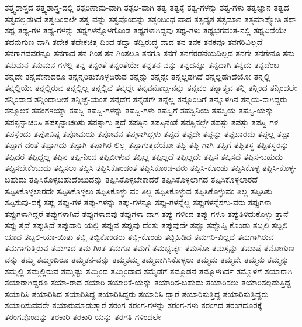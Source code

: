 {ತತ್ತ್ವಶಾಸ್ತ್ರದ
ತತ್ತ್ವಶಾಸ್ತ್ರ-ದಲ್ಲಿ
ತತ್ಪರಿಣಾಮ-ವಾಗಿ
ತತ್ಫಲ-ವಾಗಿ
ತತ್ವ
ತತ್ವಕ್ಕೆ
ತತ್ವ-ಗಳನ್ನು
ತತ್ವ-ಗಳು
ತತ್ವಜ್ಞಾನ
ತತ್ವದ
ತತ್ವದಲ್ಲಡಗಿದೆ
ತತ್ವದಿಂದಲೇ
ತತ್ವ-ವನ್ನು
ತತ್ವವೊಂದನ್ನು
ತತ್ಸಂಬಂಧ-ವಾದ
ತತ್ಸದೃಶ
ತತ್ಸಮಾನ
ತತ್ಸಮಾಪ್ನೋತಿ
ತಥಾ
ತಥ್ಯ
ತಥ್ಯ-ಗಳ
ತಥ್ಯ-ಗಳನ್ನು
ತಥ್ಯಗಳನ್ನೊಳಗೊಂಡ
ತಥ್ಯಗಳಾಗಿದ್ದವು
ತಥ್ಯ-ಗಳು
ತಥ್ಯಭಗವಂತ-ನಲ್ಲಿ
ತಥ್ಯವಿದೆಯೇ
ತದನುಗುಣ-ವಾಗಿ
ತದೇಕ
ತದೇಕಚಿತ್ತ-ದಿಂದ
ತದ್ವಾ
ತದ್ವಿರುದ್ಧ-ವಾದ
ತನ
ತನಕ
ತನಕವೂ
ತನಗರಿವಿಲ್ಲದೆ
ತನಗಾಗದವರನ್ನೂ
ತನಗಾದ
ತನ-ಗಿಂತ
ತನ-ಗಿಂತಲೂ
ತನಗೂ
ತನಗೆ
ತನಗೆರಡನೆಯದಿಲ್ಲದ
ತನಗೇ
ತನಗೇನೂ
ತನು
ತನುಮನ
ತನುಮನ-ಗಳಲ್ಲಿ
ತನ್ನ
ತನ್ನಂತೆ
ತನ್ನಂತೆಯೇ
ತನ್ನತನ-ವನ್ನು
ತನ್ನದನ್ನೂ
ತನ್ನದಾಗಿ
ತನ್ನದು
ತನ್ನದೆಂಬ
ತನ್ನದೇ
ತನ್ನದೇನಾದರೂ
ತನ್ನನ್ನರಿತುಕೊಳ್ಳದಿರುವ
ತನ್ನನ್ನು
ತನ್ನನ್ನೇ
ತನ್ನಲ್ಲಡಗಿದೆ
ತನ್ನಲ್ಲಡಗಿದೆಯೋ
ತನ್ನಲ್ಲಿ
ತನ್ನಲ್ಲಿಯೇ
ತನ್ನಲ್ಲಿರುವ
ತನ್ನಲ್ಲಿಲ್ಲ
ತನ್ನಲ್ಲಿವೆ
ತನ್ನಲ್ಲೇ
ತನ್ನವನೊಬ್ಬ-ನನ್ನು
ತನ್ನವರ
ತನ್ನಾತ್ಮವ
ತನ್ನಿ
ತನ್ನಿಂದ
ತನ್ನಿಂದಲೇ
ತನ್ನಿಂದಾದ
ತನ್ನಿಂದಾದೀತೆ
ತನ್ನಿಚ್ಛೆ-ಯಂತೆ
ತನ್ನೆಡೆಗೆ
ತನ್ನೆಡೆಗೇ
ತನ್ನೆಲ್ಲ
ತನ್ನೊಂದಿಗೆ
ತನ್ನೊಳಗಿನ
ತನ್ಮಯ-ರಾಗಿದ್ದರು
ತನ್ಮೂಲಕ
ತಪಂಗಳಯ್ಯಾ
ತಪಸ್ವಿ
ತಪಸ್ವಿ-ಗಳನ್ನು
ತಪಸ್ವಿ-ಗಳು
ತಪಸ್ವಿಗೆ
ತಪಸ್ವಿನಿಯ
ತಪಸ್ವಿಯ
ತಪಸ್ವಿ-ಯನ್ನು
ತಪಸ್ಸನ್ನಾಚರಿಸಿ
ತಪಸ್ಸನ್ನಾಚರಿಸು
ತಪಸ್ಸಾಗು-ತ್ತದೆ
ತಪಸ್ಸಿನ
ತಪಸ್ಸಿನಂತೆ
ತಪಸ್ಸಿನಲ್ಲೇ
ತಪಸ್ಸು
ತಪಸ್ಸು-ತಪಸ್ವಿ-ಗಳ
ತಪಸ್ಸೆಂದು
ತಪೋನಿಷ್ಠ
ತಪೋಮಯ
ತಪೋವನ
ತಪ್ತಳಾಗಿದ್ದಳು
ತಪ್ಪದೆ
ತಪ್ಪದೇ
ತಪ್ಪನ್ನು
ತಪ್ಪಬಾರದು
ತಪ್ಪಲ್ಲ
ತಪ್ಪಾ
ತಪ್ಪಾಗ-ದಂತೆ
ತಪ್ಪಾಗದು
ತಪ್ಪಾಗಿ
ತಪ್ಪಾಗಿರ-ಲಿಲ್ಲ
ತಪ್ಪಾಗುತ್ತದೆಯೋ
ತಪ್ಪಿ
ತಪ್ಪಿ-ಗಾಗಿ
ತಪ್ಪಿಗೆ
ತಪ್ಪಿತಸ್ಥ
ತಪ್ಪಿತಸ್ಥರನ್ನು
ತಪ್ಪಿದರೆ
ತಪ್ಪಿದ್ದಲ್ಲ
ತಪ್ಪಿನ
ತಪ್ಪಿ-ನಿಂದ
ತಪ್ಪಿಬೀಳುವ
ತಪ್ಪಿಲ್ಲ
ತಪ್ಪಿಲ್ಲದೆ
ತಪ್ಪಿಲ್ಲದೇ
ತಪ್ಪಿಸ
ತಪ್ಪಿಸದೆ
ತಪ್ಪಿಸ-ಬಹುದು
ತಪ್ಪಿಸಬೇಕೆಂಬುದು
ತಪ್ಪಿಸಲು
ತಪ್ಪಿಸಿ
ತಪ್ಪಿಸಿಕೊಂಡಂತೆ
ತಪ್ಪಿಸಿಕೊಂಡ-ವರು
ತಪ್ಪಿಸಿ-ಕೊಂಡು
ತಪ್ಪಿಸಿಕೊಳ್ಳ
ತಪ್ಪಿಸಿ-ಕೊಳ್ಳ-ಬಹುದು
ತಪ್ಪಿಸಿಕೊಳ್ಳಬಹುದೆಂಬುದನ್ನು
ತಪ್ಪಿಸಿಕೊಳ್ಳಬೇಕಾದರೆ
ತಪ್ಪಿಸಿಕೊಳ್ಳಲಾಗದ
ತಪ್ಪಿಸಿಕೊಳ್ಳಲಾರದೆ
ತಪ್ಪಿಸಿಕೊಳ್ಳಲಾರದೇ
ತಪ್ಪಿಸಿಕೊಳ್ಳಲು
ತಪ್ಪಿಸಿಕೊಳ್ಳು-ವಂ-ತಿಲ್ಲ
ತಪ್ಪಿಸಿಕೊಳ್ಳುವ
ತಪ್ಪಿಸಿಕೊಳ್ಳುವಂ-ತಿಲ್ಲ
ತಪ್ಪಿಸಿತು
ತಪ್ಪಿಸುವು-ದಕ್ಕೆ
ತಪ್ಪು
ತಪ್ಪು-ಗಳ
ತಪ್ಪು-ಗಳನ್ನು
ತಪ್ಪು-ಗಳನ್ನೂ
ತಪ್ಪು-ಗಳನ್ನೆಲ್ಲ
ತಪ್ಪುಗಳನ್ನೆಸಗು-ವರು
ತಪ್ಪುಗಳಾ
ತಪ್ಪುಗಳಾಗಿದ್ದರೆ
ತಪ್ಪುಗಳಾಗಿವೆ
ತಪ್ಪುಗಳಾದವು
ತಪ್ಪುಗಳಾ-ದಾಗ
ತಪ್ಪು-ಗಳಿಂದ
ತಪ್ಪು-ಗಳೂ
ತಪ್ಪುತಿಳಿದುಕೊಳ್ಳು-ತ್ತಾನೆ
ತಪ್ಪು-ತ್ತದೆ
ತಪ್ಪುತ್ತಿದೆ
ತಪ್ಪುದಾರಿ-ಯಲ್ಲಿ
ತಪ್ಪುವ
ತಪ್ಪುವು-ದೆಂತು
ತಪ್ಪುವುದೇ
ತಪ್ಪೂ
ತಪ್ಪೊಪ್ಪಿ-ಕೊಂಡು
ತಬ್ಬಲಿ
ತಬ್ಬಲಿ-ಯಾದ
ತಬ್ಬಲಿ-ಯಾ-ಯಿತು
ತಬ್ಬಿ
ತಬ್ಬಿಕೊಂಡರು
ತಬ್ಬಿ-ಕೊಂಡು
ತಬ್ಬಿಹಿಡಿದ
ತಮಗರಿ-ವಿಲ್ಲದೆ
ತಮಗಾಗಿರುವ
ತಮಗಾಗುತ್ತಿರುವ
ತಮಗಾದ
ತಮ-ಗಿಂತ
ತಮಗೂ
ತಮಗೆ
ತಮಭ್ಯರ್ಚ್ಯ
ತಮಸೋ
ತಮಸ್ಸನ್ನು
ತಮಾಷೆ
ತಮೋಗುಣ-ವನ್ನು
ತಮ್ಮ
ತಮ್ಮಂದಿರೂ
ತಮ್ಮತನ-ವನ್ನು
ತಮ್ಮತಮ್ಮ
ತಮ್ಮದಾಗಿಸಿಕೊಳ್ಳಲು
ತಮ್ಮದು
ತಮ್ಮದೇ
ತಮ್ಮನು
ತಮ್ಮನ್ನು
ತಮ್ಮಲ್ಲಿ
ತಮ್ಮಲ್ಲಿರುವ
ತಮ್ಮಷ್ಟು
ತಮ್ಮಿಂದ
ತಮ್ಮಿಂದಾದ
ತಮ್ಮೆಡೆಗೆ
ತಮ್ಮೊಡನೆ
ತಮ್ಮೊಳಗಿರ್ದ
ತಮ್ಮೊಳಗೆ
ತಯಾರಾಗಿ
ತಯಾರಾಗಿದ್ದರೂ
ತಯಾ-ರಾದ
ತಯಾರಿ
ತಯಾರಿಕೆ-ಯನ್ನು
ತಯಾರಿಸ-ಬಹುದು
ತಯಾರಿಸಲು
ತಯಾರಿಸಲ್ಪಡುತ್ತಿದ್ದ
ತಯಾರಿಸಿ
ತಯಾರಿಸಿದ
ತಯಾರಿಸಿದ್ದ
ತಯಾರಿಸಿದ್ದರು
ತಯಾರಿಸಿ-ದ್ದಾರೆ
ತಯಾರಿಸುತ್ತಿದ್ದ
ತಯಾರಿಸುತ್ತಿದ್ದರು
ತಯಾರಿಸುವವರೇ
ತಯಾರುಮಾಡುತ್ತಾರೆ
ತರಂಗ
ತರಂಗ-ಗಳನ್ನು
ತರಂಗ-ಗಳು
ತರಂಗದ
ತರಂಗದೂರಕ್ಕೆ
ತರಂಗವೊಂದನ್ನು
ತರಕಾರಿ
ತರಕಾರಿ-ಯನ್ನು
ತರಗತಿ-ಗಳಿಂದಲೇ
}

